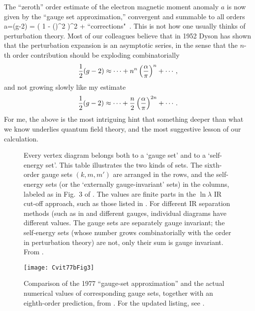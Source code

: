 The ``zeroth'' order
estimate of the electron magnetic moment anomaly $a$ is now given by
the ``gauge set approximation,'' convergent and summable to all orders
\beq
a=(g-2) =   \frac{\alpha}{\pi}
           {\left( 1 - \left(\frac{\alpha}{\pi}\right)^2
			\right)^2
		      } + \mbox{``corrections"}
\,.
This is not how one usually thinks of perturbation theory.
Most of our colleagues believe that in 1952
Dyson has shown that the perturbation expansion is an
asymptotic series, in the sense that the $n$-th order contribution should
be exploding combinatorially
$$
{1 \over 2} (g-2) \approx
\cdots + n^n \left(\frac{\alpha}{\pi}\right)^n + \cdots
\,,
$$
and not growing slowly like my estimate
\[
{1 \over 2} (g-2) \approx
\cdots + \frac{n}{2}\left(\frac{\alpha}{\pi}\right)^{2n} + \cdots
\,.
\]
For me, the above is the most intriguing hint that something deeper than
what we know underlies quantum field theory, and the most suggestive
lesson of our calculation.




\begin{sidewaysfigure}[p]
\caption{\label{Cvit77bFig2}
Every vertex diagram belongs both to a `gauge set' and to a `self-energy set'.
This table illustrates the two kinds of sets.
The sixth-order gauge sets $(k,m,m')$ are arranged in the rows, and the
self-energy sets (or the `externally gauge-invariant' sets) in the
columns, labeled as in Fig.~3 of . The values are
finite parts in the $\ln\lambda$ IR cut-off approach, such as those
listed in . For different IR separation methods (such as
in  and different gauges, individual diagrams have
different values. The gauge sets are separately gauge invariant; the
self-energy sets (whose number grows combinatorially with the order in
perturbation theory) are not, only their sum is gauge invariant. From
.
}
 \end{sidewaysfigure}

\begin{figure}
\begin{center}
\texttt{[image: Cvit77bFig3]}
\end{center}
\caption{\label{Cvit77bFig3}
Comparison of the 1977 ``gauge-set approximation'' and the actual
numerical values of corresponding gauge sets, together with an
eighth-order prediction,
from . For the updated listing, see
.
}
 \end{figure}

